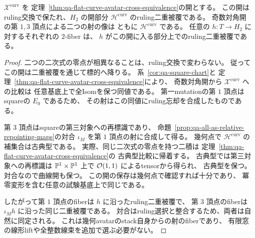 \begin{theorem}[奇数対角開の常に定義される二頂点の像とfiber]
\label{thm:qa-avatar-odd-h2-image}
$\mathcal X^{\mathrm{curv}}$ を
定理~\ref{thm:qa-flat-curve-avatar-cross-equivalence}の開とする。
この開はruling交換で保たれ、$H_2$ の開部分
$\mathcal H^{\mathrm{curv}}$ のruling二重被覆である。
奇数対角開の第 $1,3$ 頂点による二つの射の像は
ともに $\mathcal H^{\mathrm{curv}}$ である。
任意の $h:T\to H_2$ に対するそれぞれの $2$-fiber は、
$h$ がこの開に入る部分上でのruling二重被覆である。
\end{theorem}
\begin{proof}
二つの二次式の零点が相異なることは、ruling交換で変わらない。
従ってこの開は二重被覆を通じて標的へ降りる。
系~\ref{cor:qa-square-chart}と
定理~\ref{thm:qa-flat-curve-avatar-cross-equivalence}により、
奇数対角開から $\mathcal X^{\mathrm{curv}}$ への比較は
任意基底上で全Isomを保つ同値である。
第一mutationの第 $1$ 頂点はsquareの $E_0$ であるため、
その射はこの同値にruling忘却を合成したものである。

第 $3$ 頂点はsquareの第三対象への再標識であり、
命題~\ref{prop:qa-all-as-relative-repointing-maps}の対合
$\iota_M$ を第 $1$ 頂点の射に合成して得る。
幾何点で $\mathcal H^{\mathrm{curv}}$ の補集合は古典型である。
実際、同じ二次式の零点を持つ二積は
定理~\ref{thm:qa-flat-curve-avatar-cross-equivalence}の
古典型比較に帰着する。
古典型では第三対象への再標識は
$\mathbb P^1\times\mathbb P^1$ 上で $\mathcal O(1,1)$ によるtensorから得られ、
古典型を保つ。対合なので曲線開も保つ。
この開の保存は幾何点で確認すれば十分であり、
冪零変形を含む任意の試験基底上で同じである。

したがって第 $1$ 頂点のfiberは $h$ に沿ったruling二重被覆で、
第 $3$ 頂点のfiberは $\iota_M h$ に沿った同じ二重被覆である。
対合はruling選択と整合するため、両者は自然に同定される。
これは幾何avatarのstack自身からの射のfiberであり、
有限窓の線形liftや全整数線束を追加で選ぶ必要がない。
\end{proof}

